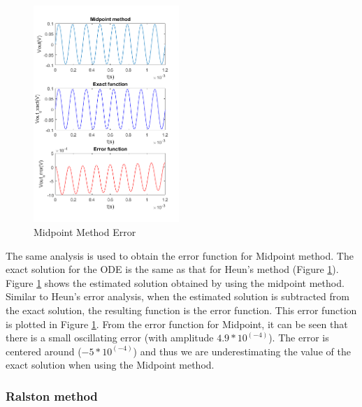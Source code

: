 \documentclass[11pt,a4paper]{article}
\begin{document}
\begin{figure}
	\vspace{-10mm}
	\includegraphics[width=0.49\textwidth]{Ex2_Figs/error_midpoint.png}
	\vspace{-6mm}
	\caption{Midpoint Method Error}
	\label{fig:Midpoint_Error}
\end{figure}

The same analysis is used to obtain the error function for Midpoint method. The exact solution for the ODE is the same as that for Heun's method (Figure \ref{fig:Midpoint_Error}).  Figure \ref{fig:Midpoint_Error} shows the estimated solution obtained by using the midpoint method. Similar to Heun's error analysis, when the estimated solution is subtracted from the exact solution, the resulting function is the error function. This error function is plotted in Figure \ref{fig:Midpoint_Error}.
From the error function for Midpoint, it can be seen that there is a small oscillating error (with amplitude $4.9*10^(-4)$). The error is centered around ($-5*10^(-4)$) and thus we are underestimating the value of the exact solution when using the Midpoint method.

 \pagebreak

\subsubsection{Ralston method}
\end{document}
